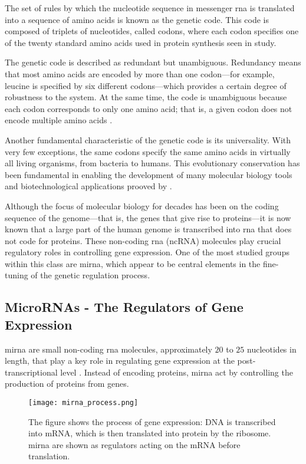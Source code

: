 The set of rules by which the nucleotide sequence in messenger \gls{rna} is
translated into a sequence of amino acids is known as the genetic code. This
code is composed of triplets of nucleotides, called codons, where each codon
specifies one of the twenty standard amino acids used in protein synthesis seen
in \textcite{genetic_codeNovozhilov2008O} study.

The genetic code is described as redundant but unambiguous. Redundancy means
that most amino acids are encoded by more than one codon—for example, leucine
is specified by six different codons—which provides a certain degree of
robustness to the system. At the same time, the code is unambiguous because
each codon corresponds to only one amino acid; that is, a given codon does not
encode multiple amino acids \cite{ConceptsBiology_DNA}.

Another fundamental characteristic of the genetic code is its universality.
With very few exceptions, the same codons specify the same amino acids in
virtually all living organisms, from bacteria to humans. This evolutionary
conservation has been fundamental in enabling the development of many molecular
biology tools and biotechnological applications prooved by
\textcite{genetic_codeKoonin2017}.

Although the focus of molecular biology for decades has been on the coding
sequence of the genome—that is, the genes that give rise to proteins—it is now
known that a large part of the human genome is transcribed into \gls{rna} that
does not code for proteins. These non-coding \gls{rna} (ncRNA) molecules play
crucial regulatory roles in controlling gene expression. One of the most
studied groups within this class are \gls{mirna}, which appear to be central
elements in the fine-tuning of the genetic regulation process.

\subsection{MicroRNAs - The Regulators of Gene Expression}
\label{sec:microRNA}
\gls{mirna} are small non-coding \gls{rna} molecules, approximately $20$
to $25$ nucleotides in length, that play a key role in regulating gene
expression at the post-transcriptional level
\cite{regulatory_mecha_mirnaGulyaeva2016,
  first_mirna_Ambros1993,post_transcript_wightman1993}. Instead of encoding
proteins, \gls{mirna} act by controlling the production of proteins from genes.

\begin{figure}[h]
  \centering
  \texttt{[image: mirna\_process.png]}
  \caption{The figure shows the process of gene expression: DNA is transcribed
    into mRNA, which is then translated into protein by the ribosome. \gls{mirna}
    are shown as regulators acting on the mRNA before translation.}
  \label{fig:mirna_mechanism}
\end{figure}

